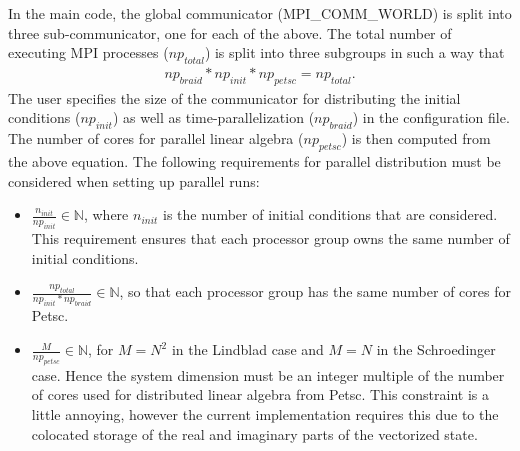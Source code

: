 \documentclass[11pt]{article}
\begin{document}
    In the main code, the global communicator (MPI\_COMM\_WORLD) is split into
    three sub-communicator, one for each of the above. The total number of executing MPI
    processes ($np_{total}$) is split into three subgroups in such a way that 
    \begin{align*}
      np_{braid} * np_{init} * np_{petsc} = np_{total}.
    \end{align*}
    The user specifies the size of the communicator for distributing the
    initial conditions ($np_{init}$) as well as time-parallelization
    ($np_{braid}$) in the configuration file. The number of cores for parallel linear
    algebra ($np_{petsc}$) is then computed from the above equation. The
    following requirements for parallel distribution must be considered when
    setting up parallel runs:
    \begin{itemize}
    \item $\frac{n_{init}}{np_{init}} \in \mathds{N}$, where $n_{init}$ is
      the number of initial conditions that are considered. This requirement
      ensures that each processor group owns the same number of initial
      conditions.
    \item $\frac{np_{total}}{np_{init}*np_{braid}} \in \mathds{N}$, so that
      each processor group has the same number of cores for Petsc.
    \item $\frac{M}{np_{petsc}} \in \mathds{N}$, for $M=N^2$ in the Lindblad case and $M=N$ in the Schroedinger case. Hence the system dimension must be an integer multiple of the number of cores used for
      distributed linear algebra from Petsc. This constraint is a little
      annoying, however the current implementation requires this due to the
      colocated storage of the real and imaginary parts of the vectorized
      state.
    \end{itemize}
\end{document}
